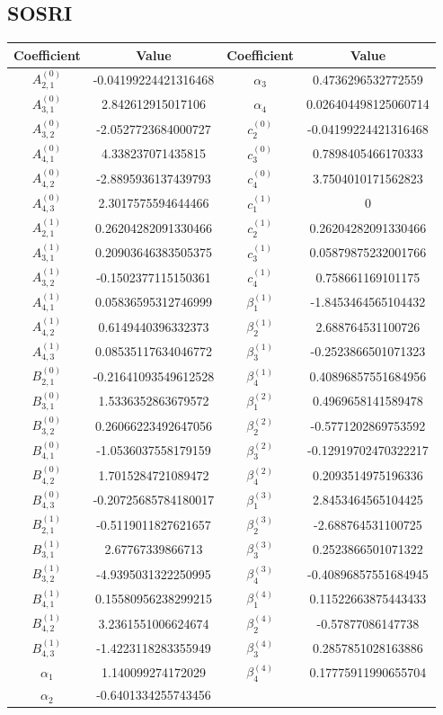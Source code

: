 \documentclass{article}
\begin{document}
\subsection{SOSRI \label{subsec:SOSRI}}
\begin{center}
	\begin{tabular}{|c|c||c|c|}
		\hline
		Coefficient & Value & Coefficient & Value\tabularnewline
		\hline
		\hline
		$A_{2,1}^{(0)}$ & -0.04199224421316468 & $\alpha_{3}$ & 0.4736296532772559\tabularnewline
		\hline
		$A_{3,1}^{(0)}$ & 2.842612915017106 & $\alpha_{4}$ & 0.026404498125060714\tabularnewline
		\hline
		$A_{3,2}^{(0)}$ & -2.0527723684000727 & $c_{2}^{(0)}$ & -0.04199224421316468\tabularnewline
		\hline
		$A_{4,1}^{(0)}$ & 4.338237071435815 & $c_{3}^{(0)}$ & 0.7898405466170333\tabularnewline
		\hline
		$A_{4,2}^{(0)}$ & -2.8895936137439793 & $c_{4}^{(0)}$ & 3.7504010171562823\tabularnewline
		\hline
		$A_{4,3}^{(0)}$ & 2.3017575594644466 & $c_{1}^{(1)}$ & 0\tabularnewline
		\hline
		$A_{2,1}^{(1)}$ & 0.26204282091330466 & $c_{2}^{(1)}$ & 0.26204282091330466\tabularnewline
		\hline
		$A_{3,1}^{(1)}$ & 0.20903646383505375 & $c_{3}^{(1)}$ & 0.05879875232001766\tabularnewline
		\hline
		$A_{3,2}^{(1)}$ & -0.1502377115150361 & $c_{4}^{(1)}$ & 0.758661169101175\tabularnewline
		\hline
		$A_{4,1}^{(1)}$ & 0.05836595312746999 & $\beta_{1}^{(1)}$ & -1.8453464565104432\tabularnewline
		\hline
		$A_{4,2}^{(1)}$ & 0.6149440396332373 & $\beta_{2}^{(1)}$ & 2.688764531100726\tabularnewline
		\hline
		$A_{4,3}^{(1)}$ & 0.08535117634046772 & $\beta_{3}^{(1)}$ & -0.2523866501071323\tabularnewline
		\hline
		$B_{2,1}^{(0)}$ & -0.21641093549612528 & $\beta_{4}^{(1)}$ & 0.40896857551684956\tabularnewline
		\hline
		$B_{3,1}^{(0)}$ & 1.5336352863679572 & $\beta_{1}^{(2)}$ & 0.4969658141589478\tabularnewline
		\hline
		$B_{3,2}^{(0)}$ & 0.26066223492647056 & $\beta_{2}^{(2)}$ & -0.5771202869753592\tabularnewline
		\hline
		$B_{4,1}^{(0)}$ & -1.0536037558179159 & $\beta_{3}^{(2)}$ & -0.12919702470322217\tabularnewline
		\hline
		$B_{4,2}^{(0)}$ & 1.7015284721089472 & $\beta_{4}^{(2)}$ & 0.2093514975196336\tabularnewline
		\hline
		$B_{4,3}^{(0)}$ & -0.20725685784180017 & $\beta_{1}^{(3)}$ & 2.8453464565104425\tabularnewline
		\hline
		$B_{2,1}^{(1)}$ & -0.5119011827621657 & $\beta_{2}^{(3)}$ & -2.688764531100725\tabularnewline
		\hline
		$B_{3,1}^{(1)}$ & 2.67767339866713 & $\beta_{3}^{(3)}$ & 0.2523866501071322\tabularnewline
		\hline
		$B_{3,2}^{(1)}$ & -4.9395031322250995 & $\beta_{4}^{(3)}$ & -0.40896857551684945\tabularnewline
		\hline
		$B_{4,1}^{(1)}$ & 0.15580956238299215 & $\beta_{1}^{(4)}$ & 0.11522663875443433\tabularnewline
		\hline
		$B_{4,2}^{(1)}$ & 3.2361551006624674 & $\beta_{2}^{(4)}$ & -0.57877086147738\tabularnewline
		\hline
		$B_{4,3}^{(1)}$ & -1.4223118283355949 & $\beta_{3}^{(4)}$ & 0.2857851028163886\tabularnewline
		\hline
		$\alpha_{1}$ & 1.140099274172029 & $\beta_{4}^{(4)}$ & 0.17775911990655704\tabularnewline
		\hline
		$\alpha_{2}$ & -0.6401334255743456 &  & \tabularnewline
		\hline
	\end{tabular}
	\par\end{center}
\end{document}
